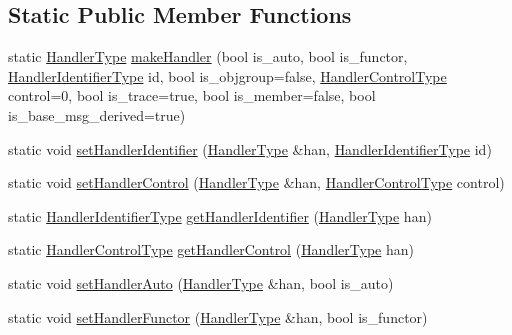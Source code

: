 \subsection*{Static Public Member Functions}
\begin{DoxyCompactItemize}
\item 
static \hyperlink{namespacevt_af64846b57dfcaf104da3ef6967917573}{Handler\+Type} \hyperlink{structvt_1_1_handler_manager_a6526360e284ab5dab5c95be3668b21d0}{make\+Handler} (bool is\+\_\+auto, bool is\+\_\+functor, \hyperlink{namespacevt_a59ae068fe828d1c33051ff96f3d016b6}{Handler\+Identifier\+Type} id, bool is\+\_\+objgroup=false, \hyperlink{namespacevt_adbbef13b92f0a93b14c219b7cc8a48f2}{Handler\+Control\+Type} control=0, bool is\+\_\+trace=true, bool is\+\_\+member=false, bool is\+\_\+base\+\_\+msg\+\_\+derived=true)
\item 
static void \hyperlink{structvt_1_1_handler_manager_a5501e67dbd88836fecdf434548de0909}{set\+Handler\+Identifier} (\hyperlink{namespacevt_af64846b57dfcaf104da3ef6967917573}{Handler\+Type} \&han, \hyperlink{namespacevt_a59ae068fe828d1c33051ff96f3d016b6}{Handler\+Identifier\+Type} id)
\item 
static void \hyperlink{structvt_1_1_handler_manager_a8cfa04599d2bd111f1197b7bf2343a05}{set\+Handler\+Control} (\hyperlink{namespacevt_af64846b57dfcaf104da3ef6967917573}{Handler\+Type} \&han, \hyperlink{namespacevt_adbbef13b92f0a93b14c219b7cc8a48f2}{Handler\+Control\+Type} control)
\item 
static \hyperlink{namespacevt_a59ae068fe828d1c33051ff96f3d016b6}{Handler\+Identifier\+Type} \hyperlink{structvt_1_1_handler_manager_a1fc8635a26795f11f16f47eaf74b25a7}{get\+Handler\+Identifier} (\hyperlink{namespacevt_af64846b57dfcaf104da3ef6967917573}{Handler\+Type} han)
\item 
static \hyperlink{namespacevt_adbbef13b92f0a93b14c219b7cc8a48f2}{Handler\+Control\+Type} \hyperlink{structvt_1_1_handler_manager_a90bf2b080d44af243e5a35bf8836d161}{get\+Handler\+Control} (\hyperlink{namespacevt_af64846b57dfcaf104da3ef6967917573}{Handler\+Type} han)
\item 
static void \hyperlink{structvt_1_1_handler_manager_a9100f9e0e946b58d98d104a5cbcf5574}{set\+Handler\+Auto} (\hyperlink{namespacevt_af64846b57dfcaf104da3ef6967917573}{Handler\+Type} \&han, bool is\+\_\+auto)
\item 
static void \hyperlink{structvt_1_1_handler_manager_a25c8a39b9faea3e894021d5c6d52f903}{set\+Handler\+Functor} (\hyperlink{namespacevt_af64846b57dfcaf104da3ef6967917573}{Handler\+Type} \&han, bool is\+\_\+functor)

\end{DoxyCompactItemize}
